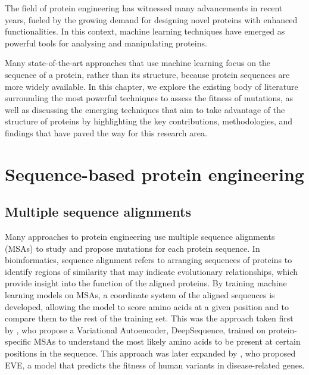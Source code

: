The field of protein engineering has witnessed many advancements in recent years, fueled by the growing demand for designing novel proteins with enhanced functionalities. In this context, machine learning techniques have emerged as powerful tools for analysing and manipulating proteins. 

Many state-of-the-art approaches that use machine learning focus on the sequence of a protein, rather than its structure, because protein sequences are more widely available. In this chapter, we explore the existing body of literature surrounding the most powerful techniques to assess the fitness of mutations, as well as discussing the emerging techniques that aim to take advantage of the structure of proteins by highlighting the key contributions, methodologies, and findings that have paved the way for this research area.

\section{Sequence-based protein engineering}

\subsection{Multiple sequence alignments}
Many approaches to protein engineering use multiple sequence alignments (MSAs) to study and propose mutations for each protein sequence. In bioinformatics, sequence alignment refers to arranging sequences of proteins to identify regions of similarity that may indicate evolutionary relationships, which provide insight into the function of the aligned proteins. By training machine learning models on MSAs, a coordinate system of the aligned sequences is developed, allowing the model to score amino acids at a given position and to compare them to the rest of the training set. This was the approach taken first by \citet{deepsequence}, who propose a Variational Autoencoder, DeepSequence, trained on protein-specific MSAs to understand the most likely amino acids to be present at certain positions in the sequence. This approach was later expanded by \citet{EVE}, who proposed EVE, a model that predicts the fitness of human variants in disease-related genes. 

